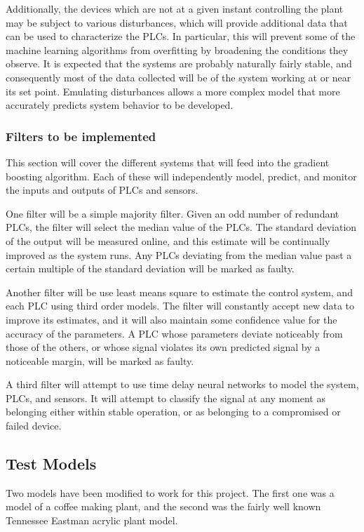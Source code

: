 \documentclass[10pt,twocolumn]{IEEEtran}
\begin{document}
Additionally, the devices which are not at a given instant controlling the plant may be subject to various disturbances, which will provide additional data that can be used to characterize the PLCs.
In particular, this will prevent some of the machine learning algorithms from overfitting by broadening the conditions they observe.
It is expected that the systems are probably naturally fairly stable, and consequently most of the data collected will be of the system working at or near its set point.
Emulating disturbances allows a more complex model that more accurately predicts system behavior to be developed.

\subsubsection{Filters to be implemented}
This section will cover the different systems that will feed into the gradient boosting algorithm.
Each of these will independently model, predict, and monitor the inputs and outputs of PLCs and sensors.

One filter will be a simple majority filter.
Given an odd number of redundant PLCs, the filter will select the median value of the PLCs.
The standard deviation of the output will be measured online, and this estimate will be continually improved as the system runs.
Any PLCs deviating from the median value past a certain multiple of the standard deviation will be marked as faulty.

Another filter will be use least means square to estimate the control system, and each PLC using third order models.
The filter will constantly accept new data to improve its estimates, and it will also maintain some confidence value for the accuracy of the parameters.
A PLC whose parameters deviate noticeably from those of the others, or whose signal violates its own predicted signal by a noticeable margin, will be marked as faulty.

A third filter will attempt to use time delay neural networks to model the system, PLCs, and sensors.
It will attempt to classify the signal at any moment as belonging either within stable operation, or as belonging to a compromised or failed device.

\subsection{Test Models}\label{sec:models}
Two models have been modified to work for this project.
The first one was a model of a coffee making plant, and the second was the fairly well known Tennessee Eastman acrylic plant model.
\end{document}
